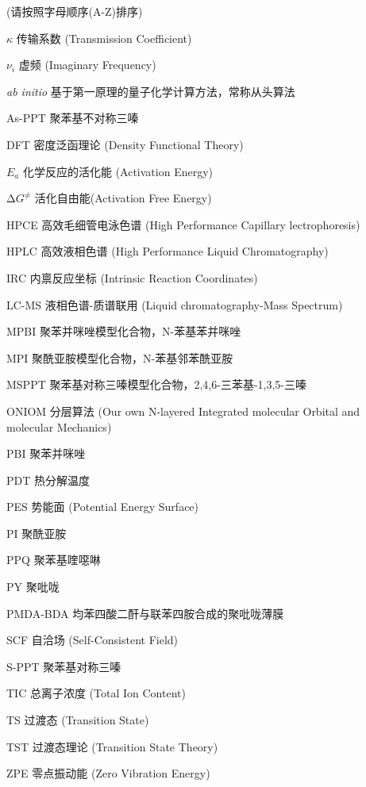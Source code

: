 
\begin{denotation}[3cm]
  \item[] {\fangsong (请按照字母顺序(A-Z)排序)}
  \item[$\kappa$] 传输系数 (Transmission Coefficient)
  \item[$\nu_i$] 虚频 (Imaginary Frequency)
  \item[\textit{ab initio}] 基于第一原理的量子化学计算方法，常称从头算法
  \item[As-PPT] 聚苯基不对称三嗪
  \item[DFT] 密度泛函理论 (Density Functional Theory)
  \item[$E_a$] 化学反应的活化能 (Activation Energy)
  \item[$\increment G^\neq$] 活化自由能(Activation Free Energy)
  \item[HPCE] 高效毛细管电泳色谱 (High Performance Capillary lectrophoresis)
  \item[HPLC] 高效液相色谱 (High Performance Liquid Chromatography)
  \item[IRC] 内禀反应坐标 (Intrinsic Reaction Coordinates)
  \item[LC-MS] 液相色谱-质谱联用 (Liquid chromatography-Mass Spectrum)
  \item[MPBI] 聚苯并咪唑模型化合物，N-苯基苯并咪唑
  \item[MPI] 聚酰亚胺模型化合物，N-苯基邻苯酰亚胺
  \item[MSPPT] 聚苯基对称三嗪模型化合物，2,4,6-三苯基-1,3,5-三嗪
  \item[ONIOM] 分层算法 (Our own N-layered Integrated molecular Orbital and molecular Mechanics)
  \item[PBI] 聚苯并咪唑
  \item[PDT] 热分解温度
  \item[PES] 势能面 (Potential Energy Surface)
  \item[PI] 聚酰亚胺
  \item[PPQ] 聚苯基喹噁啉
  \item[PY] 聚吡咙
  \item[PMDA-BDA] 均苯四酸二酐与联苯四胺合成的聚吡咙薄膜
  \item[SCF] 自洽场 (Self-Consistent Field)
  \item[S-PPT] 聚苯基对称三嗪
  \item[TIC] 总离子浓度 (Total Ion Content)
  \item[TS] 过渡态 (Transition State)
  \item[TST] 过渡态理论 (Transition State Theory)
  \item[ZPE] 零点振动能 (Zero Vibration Energy)
\end{denotation}




